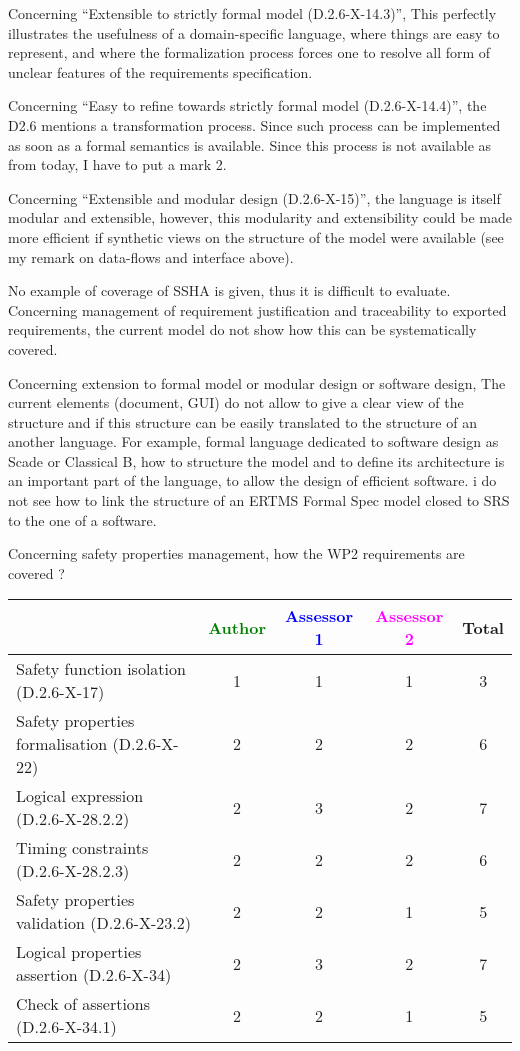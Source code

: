 \begin{assessor1}
Concerning "`Extensible to strictly formal model (D.2.6-X-14.3)"', This perfectly illustrates the usefulness of a domain-specific language, where things are easy to represent, and where the formalization process forces one to resolve all form of unclear features of the requirements specification. 

Concerning "`Easy to refine towards strictly formal model (D.2.6-X-14.4)"', the D2.6 mentions a transformation process. Since such process can be implemented as soon as a formal semantics is available. Since this process is not available as from today, I have to put a mark 2. 

Concerning "`Extensible and modular design (D.2.6-X-15)"', the language is itself modular and extensible, however, this modularity and extensibility could be made more efficient if synthetic views on the structure of the model were available (see my remark on data-flows and interface above). 
\end{assessor1}

\begin{assessor2}
No example of coverage of SSHA is given, thus it is difficult to evaluate. Concerning management of requirement justification and traceability to exported requirements, the current model do not show how this can be systematically covered.

Concerning extension to formal model or modular design or software design, The current elements (document, GUI)  do not allow to give a clear view of the structure and if this structure can be easily translated to  the structure of an another language. For example, formal language dedicated to software design as Scade or Classical B, how to structure the model and to define its architecture is an important part of the language, to allow the design of efficient software. i do not see how to link the structure of an ERTMS Formal Spec model closed to SRS to  the one of a software.

\end{assessor2}


Concerning safety properties management, how the WP2 requirements are covered ?

\begin{tabular}{|l | c | c | c | c|}
\hline
& \textcolor{green}{Author} & \textcolor{blue}{Assessor 1} & \textcolor{magenta}{Assessor 2} & Total \\
\hline 
Safety function isolation (D.2.6-X-17)  & 1 & 1 & 1 & 3 \\
\hline 
Safety properties formalisation (D.2.6-X-22)  & 2 & 2 & 2 & 6 \\
\hline
Logical expression (D.2.6-X-28.2.2)  & 2 & 3 & 2 & 7 \\
\hline
Timing constraints (D.2.6-X-28.2.3)  & 2 & 2 & 2 & 6 \\
\hline
Safety properties validation (D.2.6-X-23.2)  & 2 & 2 & 1 & 5 \\
\hline
Logical properties assertion (D.2.6-X-34)  & 2 & 3 & 2 & 7 \\
\hline
Check  of assertions (D.2.6-X-34.1)  & 2 & 2 & 1 & 5 \\
\hline
\end{tabular}

